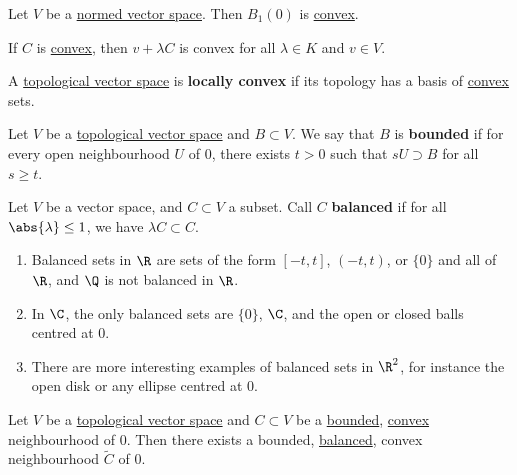 \documentclass{article}
\begin{document}
\begin{fact}
    Let $V$ be a \hyperlink{def:normedVectorSpace}{normed vector space}. Then $B_1(0)$ is \hyperlink{def:convexSubs}{convex}.
\end{fact}

\begin{fact}
    If $C$ is \hyperlink{def:convexSubs}{convex}, then $v + \lambda C$ is convex for all $\lambda \in K$ and $v \in V$.
\end{fact}

\begin{defi}
    A \hyperlink{def:topologicalVectorSpace}{topological vector space} is \textbf{locally convex} if its topology has a basis of \hyperlink{def:convexSubs}{convex} sets.
\end{defi}

\begin{defi}
    Let $V$ be a \hyperlink{def:topologicalVectorSpace}{topological vector space} and $B \subset V$. We say that $B$ is \textbf{bounded} if for every open neighbourhood $U$ of $0$, there exists $t > 0$ such that $s U \supset B$ for all $s \geq t$.
\end{defi}

\begin{defi}
    Let $V$ be a vector space, and $C \subset V$ a subset. Call $C$ \textbf{balanced} if for all $\abs{\lambda} \leq 1$, we have $\lambda C \subset C$.
\end{defi}

\begin{eg}
    \leavevmode
    \begin{enumerate}[label=(\roman*)]
        \item Balanced sets in $\R$ are sets of the form $[-t, t]$, $(-t, t)$, or $\{0\}$ and all of $\R$, and $\Q$ is not balanced in $\R$.
        \item In $\C$, the only balanced sets are $\{0\}$, $\C$, and the open or closed balls centred at $0$.
        \item There are more interesting examples of balanced sets in $\R^2$, for instance the open disk or any ellipse centred at $0$.
    \end{enumerate}
\end{eg}

\begin{lemma}
    Let $V$ be a \hyperlink{def:topologicalVectorSpace}{topological vector space} and $C \subset V$ be a \hyperlink{def:boundedSubs}{bounded}, \hyperlink{def:convexSubs}{convex} neighbourhood of $0$.
    Then there exists a bounded, \hyperlink{def:balancedSubs}{balanced}, {convex} neighbourhood $\widetilde C$ of $0$.
\end{lemma}
\end{document}
